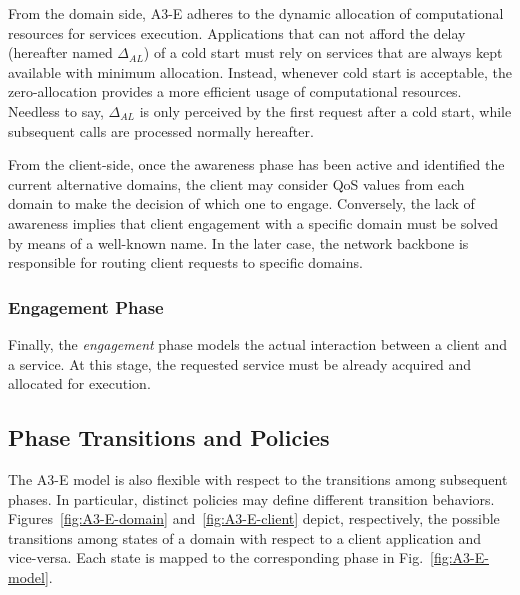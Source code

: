From the domain side, A3-E adheres to the dynamic allocation of computational resources for services execution. Applications that can not afford the delay (hereafter named $\Delta_{AL}$) of a cold start must rely on services that are always kept available with minimum allocation. Instead, whenever cold start is acceptable, the zero-allocation provides a more efficient usage of computational resources. Needless to say, $\Delta_{AL}$ is only perceived by the first request after a cold start, while subsequent calls are processed normally hereafter.

From the client-side, once the awareness phase has been active and identified the current alternative domains, the client may consider QoS values from each domain to make the decision of which one to engage. Conversely, the lack of awareness implies that client engagement with a specific domain must be solved by means of a well-known name. In the later case, the network backbone is responsible for routing client requests to specific domains.

\subsubsection{Engagement Phase}\label{sec:A3-E-engagement}

Finally, the \textit{engagement} phase models the actual interaction between a client and a service. At this stage, the requested service must be already acquired and allocated for execution. 

\subsection{Phase Transitions and Policies}

The A3-E model is also flexible with respect to the transitions among subsequent phases. In particular, distinct policies may define different transition behaviors. Figures~\ref{fig:A3-E-domain} and~\ref{fig:A3-E-client} depict, respectively, the possible transitions among states of a domain with respect to a client application and vice-versa. Each state is mapped to the corresponding phase in Fig.~\ref{fig:A3-E-model}.

